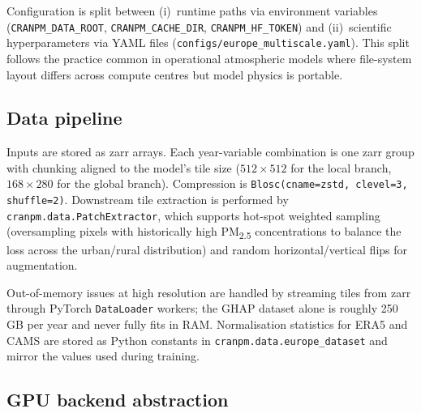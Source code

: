 Configuration is split between (i)~runtime paths via environment
variables (\texttt{CRANPM\_DATA\_ROOT}, \texttt{CRANPM\_CACHE\_DIR},
\texttt{CRANPM\_HF\_TOKEN}) and (ii)~scientific hyperparameters via
YAML files (\texttt{configs/europe\_multiscale.yaml}). This split
follows the practice common in operational atmospheric models where
file-system layout differs across compute centres but model physics
is portable.

\subsection{Data pipeline}
\label{sec:soft:data}

Inputs are stored as zarr \citep{miles2020zarr} arrays. Each
year-variable combination is one zarr group with chunking aligned
to the model's tile size ($512 \times 512$ for the local branch,
$168 \times 280$ for the global branch). Compression is
\texttt{Blosc(cname=zstd, clevel=3, shuffle=2)}. Downstream tile
extraction is performed by \texttt{cranpm.data.PatchExtractor},
which supports hot-spot weighted sampling (oversampling pixels with
historically high PM\textsubscript{2.5} concentrations to balance
the loss across the urban/rural distribution) and random
horizontal/vertical flips for augmentation.

Out-of-memory issues at high resolution are handled by streaming
tiles from zarr through PyTorch \texttt{DataLoader} workers; the
GHAP dataset alone is roughly 250\,GB per year and never fully
fits in RAM. Normalisation statistics for ERA5 and CAMS are stored
as Python constants in \texttt{cranpm.data.europe\_dataset} and
mirror the values used during training.

\subsection{GPU backend abstraction}
\label{sec:soft:gpu}


